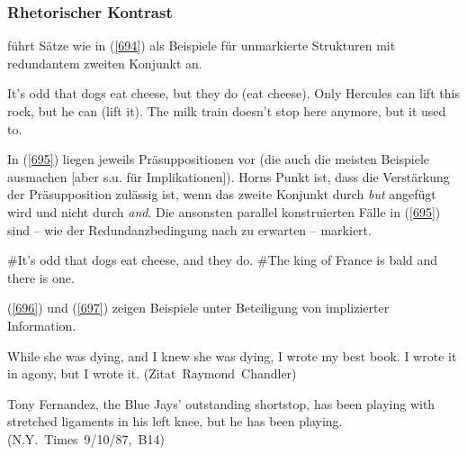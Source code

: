 \subsubsection{Rhetorischer Kontrast}
\label{sec:kontrast}
\citet{Horn1991} führt Sätze wie in (\ref{694}) als Beispiele für unmarkierte Strukturen mit redundantem zweiten Konjunkt an.

\begin{exe}
	\ex\label{694} 
		\begin{xlist}	
			\ex\label{694a} It’s odd that dogs eat cheese, but they do (eat cheese).
			\ex\label{694b} Only Hercules can lift this rock, but he can (lift it).	
			\ex\label{694c} The milk train doesn’t stop here anymore, but it used to.\\
			\hbox{}\hfill\hbox{\citet[322]{Horn1991}}
		\end{xlist}
\end{exe}	
In (\ref{695}) liegen jeweils Präsuppositionen  vor (die auch die meisten Beispiele ausmachen [aber s.u. für Implikationen]). Horns Punkt ist, dass die Verstärkung der Präsupposition zulässig ist, wenn das zweite Konjunkt durch \textit{but} angefügt wird und nicht durch \textit{and}. Die ansonsten parallel konstruierten Fälle in (\ref{695}) sind – wie der Redundanzbedingung  nach zu erwarten – markiert.
\begin{exe}
	\ex\label{695} 
		\begin{xlist}	
			\ex\label{695a} \#It’s odd that dogs eat cheese, and they do.
			\ex\label{695b} \#The king of France is bald and there is one.	
			\hfill\hbox{\citet[318/321]{Horn1991}}
		\end{xlist}
\end{exe}						
(\ref{696}) und (\ref{697}) zeigen Beispiele unter Beteiligung von implizierter Information.
\begin{exe}
	\ex\label{696} 
	While she was dying, and I knew she was dying, I wrote my best book. I wrote it in agony, but I wrote it. 		
	\hfill\hbox{(Zitat Raymond Chandler)}
	\newline
	\hbox{}\hfill\hbox{\citet[322, Fn 12]{Horn1991}}	
\end{exe}
\begin{exe}
	\ex\label{697} 
	Tony Fernandez, the Blue Jays' outstanding shortstop, has been playing with stretched ligaments in his left knee, but he 		has been playing.
	\newline
	\hbox{}\hfill\hbox{(N.Y. Times 9/10/87, B14)}
	\newline
	\hbox{}\hfill\hbox{\citet[327]{Horn1991}}	
\end{exe}
